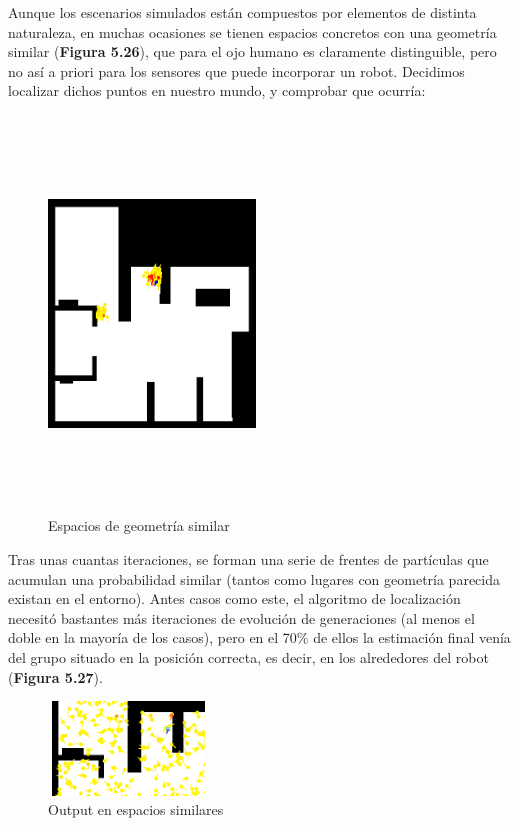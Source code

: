Aunque los escenarios simulados están compuestos por elementos de distinta naturaleza, en muchas ocasiones se tienen espacios concretos con una geometría similar (\textbf{Figura 5.26}), que para el ojo humano es claramente distinguible, pero no así a priori para los sensores que puede incorporar un robot. Decidimos localizar dichos puntos en nuestro mundo, y comprobar que ocurría:

\begin{multicols}{2}
\begin{figure}[H]
	\begin{center}
		\includegraphics[width=0.49\textwidth, height=10.5cm]{figures/similar.png}
		\caption{Espacios de geometría similar}
		\label{fig.similar}
		\end{center}
\end{figure}
Tras unas cuantas iteraciones, se forman una serie de frentes de partículas que acumulan una probabilidad similar (tantos como lugares con geometría parecida existan en el entorno). Antes casos como este, el algoritmo de localización necesitó bastantes más iteraciones de evolución de generaciones (al menos el doble en la mayoría de los casos), pero en el 70\% de ellos la estimación final venía del grupo situado en la posición correcta, es decir, en los alrededores del robot (\textbf{Figura 5.27}).
\begin{figure}[H]
	\begin{center}
		\includegraphics[width=0.38\textwidth, height=2.5cm]{figures/similaroutput.png}
		\caption{Output en espacios similares}
		\label{fig.similaroutput}
		\end{center}
\end{figure}
\end{multicols}

